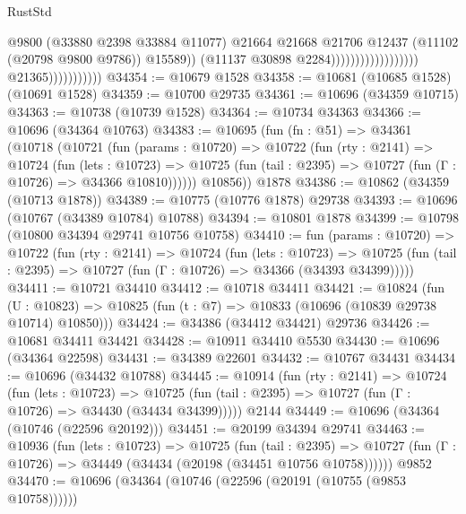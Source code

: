 \begin{lexlean}{RustStd}
\begin{coremodule}
                                                                @9800
                                                                (@33880 @2398 @33884 @11077)
                                                                @21664
                                                                @21668
                                                                @21706
                                                                @12437
                                                                (@11102 (@20798 @9800 @9786))
                                                                @15589))
                                                            (@11137 @30898 @2284))))))))))))))))))
                          @21365)))))))))))
@34354 := @10679 @1528
@34358 := @10681 (@10685 @1528) (@10691 @1528)
@34359 := @10700 @29735
@34361 := @10696 (@34359 @10715)
@34363 := @10738 (@10739 @1528)
@34364 := @10734 @34363
@34366 := @10696 (@34364 @10763)
@34383 := @10695
    (fun (fn : @51) =>
    @34361
      (@10718
        (@10721
          (fun (params : @10720) =>
          @10722
            (fun (rty : @2141) =>
            @10724
              (fun (lets : @10723) =>
              @10725 (fun (tail : @2395) => @10727 (fun (Γ : @10726) => @34366 @10810))))))
        @10856))
    @1878
@34386 := @10862 (@34359 (@10713 @1878))
@34389 := @10775 (@10776 @1878) @29738
@34393 := @10696 (@10767 (@34389 @10784) @10788)
@34394 := @10801 @1878
@34399 := @10798 (@10800 @34394 @29741 @10756 @10758)
@34410 := fun (params : @10720) =>
  @10722
    (fun (rty : @2141) =>
    @10724
      (fun (lets : @10723) =>
      @10725 (fun (tail : @2395) => @10727 (fun (Γ : @10726) => @34366 (@34393 @34399)))))
@34411 := @10721 @34410
@34412 := @10718 @34411
@34421 := @10824
    (fun (U : @10823) => @10825 (fun (t : @7) => @10833 (@10696 (@10839 @29738 @10714) @10850)))
@34424 := @34386 (@34412 @34421) @29736
@34426 := @10681 @34411 @34421
@34428 := @10911 @34410 @5530
@34430 := @10696 (@34364 @22598)
@34431 := @34389 @22601
@34432 := @10767 @34431
@34434 := @10696 (@34432 @10788)
@34445 := @10914
    (fun (rty : @2141) =>
    @10724
      (fun (lets : @10723) =>
      @10725 (fun (tail : @2395) => @10727 (fun (Γ : @10726) => @34430 (@34434 @34399)))))
    @2144
@34449 := @10696 (@34364 (@10746 (@22596 @20192)))
@34451 := @20199 @34394 @29741
@34463 := @10936
    (fun (lets : @10723) =>
    @10725
      (fun (tail : @2395) =>
      @10727 (fun (Γ : @10726) => @34449 (@34434 (@20198 (@34451 @10756 @10758))))))
    @9852
@34470 := @10696 (@34364 (@10746 (@22596 (@20191 (@10755 (@9853 @10758))))))

\end{coremodule}
\end{lexlean}
